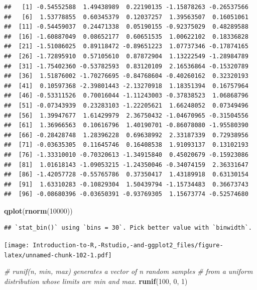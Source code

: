 \documentclass[]{book}
\newenvironment{Shaded}{\begin{snugshade}}{\end{snugshade}}
\newcommand{\KeywordTok}[1]{\textcolor[rgb]{0.13,0.29,0.53}{\textbf{{#1}}}}
\newcommand{\DecValTok}[1]{\textcolor[rgb]{0.00,0.00,0.81}{{#1}}}
\newcommand{\CommentTok}[1]{\textcolor[rgb]{0.56,0.35,0.01}{\textit{{#1}}}}
\newcommand{\NormalTok}[1]{{#1}}
\begin{document}
\begin{verbatim}
##   [1] -0.54552588  1.49438989  0.22190135 -1.15878263 -0.26537566
##   [6]  1.53778855  0.60345379  0.12037257  1.39563507  0.16051061
##  [11] -0.54459037  0.24471338  0.05190155 -0.92375029  0.48289588
##  [16] -1.60887049  0.08652177  0.60651535  1.00622102  0.18336828
##  [21] -1.51086025  0.89118472 -0.89651223  1.07737346 -0.17874165
##  [26] -1.72895910  0.57105610  0.87872904  1.13222549 -1.28984789
##  [31] -1.75402360 -0.53782593  0.83120109  2.16536864 -0.15320789
##  [36]  1.51876002 -1.70276695 -0.84768604 -0.40260162  0.32320193
##  [41]  0.10597368 -2.39801443 -2.13270918  1.18351394  0.16757964
##  [46] -0.53311526  0.70016044 -1.11243003 -0.37838523  1.06868796
##  [51] -0.07343939  0.23283103 -1.22205621  1.66248052  0.07349496
##  [56]  1.39947677  1.61429979  2.36750432 -1.04670965 -0.31504556
##  [61]  1.36966563  0.10616796  1.40190701 -0.86078080 -1.95580390
##  [66] -0.28428748  1.28396228  0.69638992  2.33187339  0.72938956
##  [71] -0.03635305  0.11645746  0.16408538  1.91093137  0.13102193
##  [76] -1.33310010 -0.70320613 -1.34915840  0.45020679 -0.15923086
##  [81]  1.01618143 -1.09053215 -1.24350046 -0.34074159  2.36331647
##  [86] -1.42057728 -0.55765786  0.37350417  1.43189918  0.63130154
##  [91]  1.63310283 -0.10829304  1.50439794 -1.15734483  0.36673743
##  [96] -0.08680396 -0.03650391 -0.93769305  1.15673774 -0.52574680
\end{verbatim}

\begin{Shaded}
\begin{Highlighting}[]
\KeywordTok{qplot}\NormalTok{(}\KeywordTok{rnorm}\NormalTok{(}\DecValTok{10000}\NormalTok{))}
\end{Highlighting}
\end{Shaded}

\begin{verbatim}
## `stat_bin()` using `bins = 30`. Pick better value with `binwidth`.
\end{verbatim}

\texttt{[image: Introduction-to-R,-Rstudio,-and-ggplot2\_files/figure-latex/unnamed-chunk-102-1.pdf]}

\begin{Shaded}
\begin{Highlighting}[]
\CommentTok{# runif(n, min, max) generates a vector of n random samples }
\CommentTok{# from a uniform distribution whose limits are min and max. }
\KeywordTok{runif}\NormalTok{(}\DecValTok{100}\NormalTok{, }\DecValTok{0}\NormalTok{, }\DecValTok{1}\NormalTok{)}
\end{Highlighting}
\end{Shaded}
\end{document}
